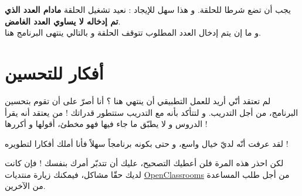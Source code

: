 يجب أن تضع شرطا للحلقة. و هذا سهل للإيجاد : نعيد تشغيل الحلقة 
\textbf{مادام العدد الذي تم إدخاله لا يساوي العدد الغامض}.\\
و ما إن يتم إدخال العدد المطلوب تتوقف الحلقة و بالتالي ينتهى البرنامج هنا.

\section*{أفكار للتحسين}

لم تعتقد أنّي أريد للعمل التطبيقي أن ينتهي هنا ؟ أنا أصرّ على أن تقوم بتحسين البرنامج، من أجل التدريب. و لتتأكد بأنه مع التدريب ستتطور قدراتك ! من يعتقد أنه يقرأ الدروس و لا يطبّق ما جاء فيها فهو مخطئ، أقولها و أكررها !

لقد عرفت أنّه لديّ خيال واسع، و حتى بكونه برنامجاً سهلاً فأنا أملك أفكارا لتطويره !

لكن احذر هذه المرة فلن أعطيك التصحيح، عليك أن تتدبّر أمرك بنفسك ! فإن كانت لديك حقّا مشاكل، فيمكنك زيارة منتديات 
\href{http://www.siteduzero.com/forum-81-126-langage-c.html}{\textenglish{OpenClassrooms}}
من أجل طلب المساعدة من الآخرين.

